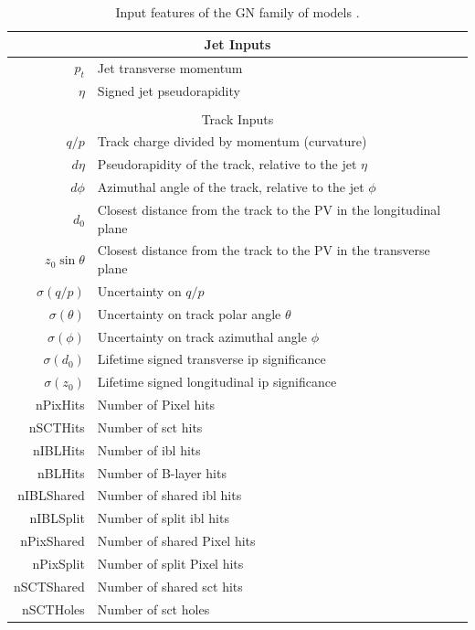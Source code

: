 \begin{table}[h]
  \begin{center}
      \begin{tabular}{rl} 
      	 \hline \hline
          \multicolumn{2}{c}{Jet Inputs}\\ \hline
          $p_t$   & Jet transverse momentum \\ 
          $\eta$  & Signed jet pseudorapidity \\ \hline \\
          \multicolumn{2}{c}{Track Inputs}\\ \hline
          $q/p$             & Track charge divided by momentum (curvature)  \\
          $d\eta$           & Pseudorapidity of the track, relative to the jet $\eta$ \\
          $d\phi$           & Azimuthal angle of the track, relative to the jet $\phi$ \\
          $d_0$             & Closest distance from the track to the PV in the longitudinal plane  \\
          $z_0 \sin\theta$  & Closest distance from the track to the PV in the transverse plane  \\
          $\sigma(q/p)$     & Uncertainty on $q/p$ \\
          $\sigma(\theta)$  & Uncertainty on track polar angle $\theta$ \\
          $\sigma(\phi)$    & Uncertainty on track azimuthal angle $\phi$ \\
          $\sigma(d_0)$     & Lifetime signed transverse \gls{ip} significance \\
          $\sigma(z_0)$     & Lifetime signed longitudinal \gls{ip} significance \\
          nPixHits          & Number of Pixel hits \\
          nSCTHits          & Number of \gls{sct} hits \\
          nIBLHits          & Number of \gls{ibl} hits \\
          nBLHits           & Number of B-layer hits \\
          nIBLShared        & Number of shared \gls{ibl} hits \\
          nIBLSplit         & Number of split \gls{ibl} hits \\
          nPixShared        & Number of shared Pixel hits \\
          nPixSplit         & Number of split Pixel hits \\
          nSCTShared        & Number of shared \gls{sct} hits \\
          nSCTHoles         & Number of \gls{sct} holes \\ \hline \hline
      \end{tabular}
    \caption{Input features of the GN family of models \cite{ATL-PHYS-PUB-2022-027}.}
    \label{tab:gnInputVariables}
  \end{center}
\end{table}

